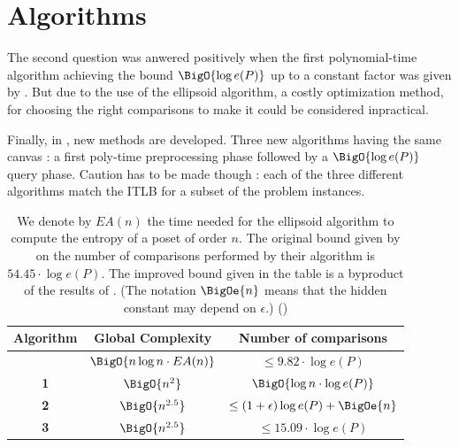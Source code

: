 \section{Algorithms}


The second question was anwered positively when the first polynomial-time algorithm achieving the bound $\BigO{\log e(P)}$ up to a constant factor was given by \cite{kahnkim1}. But due to the use of the ellipsoid algorithm, a costly optimization method, for choosing the right comparisons to make it could be considered inpractical.

Finally, in \cite{cardinal2013sorting}, new methods are developed. Three new algorithms having the same canvas : a first poly-time preprocessing phase followed by a $\BigO{\log e(P)}$ query phase. Caution has to be made though : each of the three different algorithms match the ITLB for a subset of the problem instances.

\begin{table}
	\begin{center}
	\caption{We denote by $E A(n)$ the time needed for the ellipsoid algorithm to compute the entropy of a poset of order $n$. The original bound given by \cite{kahnkim1} on the number of comparisons performed by their algorithm is $54.45 \cdot \log e(P)$. The improved bound given in the table is a byproduct of the results of \cite{cardinal2013sorting}. (The notation $\BigOe{n}$ means that the hidden constant may depend on $\epsilon$.) (\cite{cardinal2013sorting})}
	\label{tree:supi:table/jcardin}
	\begin{tabular}{|c|c|c|}

	\hline
	Algorithm & Global Complexity & Number of comparisons\\\hline\hline
	\cite{kahnkim1} & $\BigO{n \log n \cdot E A(n)}$ & $\leq 9.82 \cdot \log e(P)$\\\hline\hline
	\cite{cardinal2013sorting} \textbf{1} & $ \BigO{n^{2}} $ & $\BigO{\log n \cdot \log e(P)}$ \\\hline
	\cite{cardinal2013sorting} \textbf{2} & $ \BigO{n^{2.5}} $ & $\leq (1 + \epsilon) \log e(P) + \BigOe{n}$ \\\hline
	\cite{cardinal2013sorting} \textbf{3} & $ \BigO{n^{2.5}} $ & $\leq 15.09 \cdot \log e(P)$ \\\hline

	\end{tabular}
	\end{center}
\end{table}


